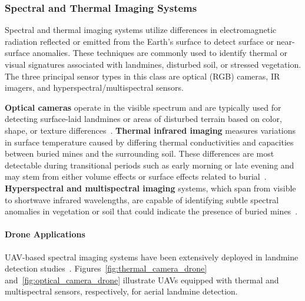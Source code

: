 \subsubsection{Spectral and Thermal Imaging Systems}\label{spectral_imaging}

Spectral and thermal imaging systems utilize differences in electromagnetic radiation reflected or emitted from the Earth's surface to detect surface or near-surface anomalies. These techniques are commonly used to identify thermal or visual signatures associated with landmines, disturbed soil, or stressed vegetation. The three principal sensor types in this class are optical (RGB) cameras, \gls{IR} imagers, and hyperspectral/multispectral sensors.

\textbf{Optical cameras} operate in the visible spectrum and are typically used for detecting surface-laid landmines or areas of disturbed terrain based on color, shape, or texture differences~\cite{cardonalandmine}. \textbf{Thermal infrared imaging} measures variations in surface temperature caused by differing thermal conductivities and capacities between buried mines and the surrounding soil. These differences are most detectable during transitional periods such as early morning or late evening and may stem from either volume effects or surface effects related to burial~\cite{Bruschini1997ASO,paik2002image,hutsul2024review}. \textbf{Hyperspectral and multispectral imaging} systems, which span from visible to shortwave infrared wavelengths, are capable of identifying subtle spectral anomalies in vegetation or soil that could indicate the presence of buried mines~\cite{robledo2009survey,alqudsi2021review}.

\paragraph{Drone Applications} \gls{UAV}-based spectral imaging systems have been extensively deployed in landmine detection studies~\cite{dena2020image,10.1117/12.2177182,Popov2022MethodFM,rs15040967,Baur2021HowTI,baur2020applying,AgrawalChung2024ComparingSL,10765909,6842242,rs16122046,qiu2023joint,ptsa-qj43-23,TENORIOTAMAYO2023109443,nikulin2018detection,FORERORAMIREZ2022104307,TENORIOTAMAYO2024105567,krause2018diurnal,Fardoulis2020PROOFHS,butt2024uav}. Figures~\ref{fig:thermal_camera_drone} and~\ref{fig:optical_camera_drone} illustrate \gls{UAV}s equipped with thermal and multispectral sensors, respectively, for aerial landmine detection.

